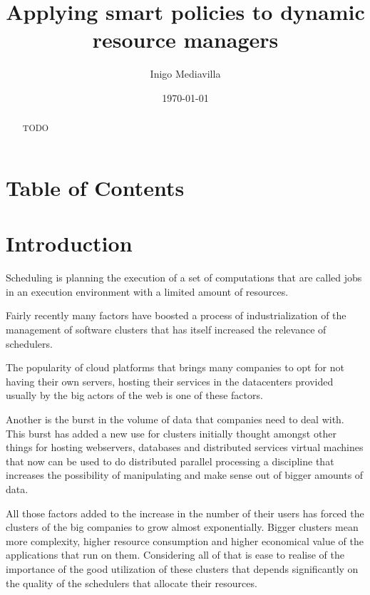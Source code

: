 \documentclass{svjour3}                     %
\begin{document}
\title{ Applying smart policies to dynamic resource managers }


\author{ Inigo Mediavilla }

\date{\today}

\maketitle

\begin{abstract}
TODO
\end{abstract}

\section{Table of Contents}

\tableofcontents

\section{Introduction}

Scheduling is planning the execution of a set of computations that
are called jobs in an execution environment with a limited amount of
resources.

Fairly recently many factors have boosted a process of
industrialization of the management of software clusters that has
itself increased the relevance of schedulers. 

The popularity of cloud platforms that brings
many companies to opt for not having their own servers, hosting their
services in the datacenters provided usually by the big actors of the
web is one of these factors. 

Another is the burst in the volume of data that companies need to deal
with. This burst has added a new use for clusters initially thought
amongst other things for hosting webservers, databases and distributed
services virtual machines that now can be used to do distributed
parallel processing a discipline that increases the possibility of
manipulating and make sense out of bigger amounts of data.

All those factors added to the increase in the number of their users
has forced the clusters of the big companies to grow almost
exponentially. Bigger clusters mean more complexity, higher resource
consumption and higher economical value of the applications that run
on them. Considering all of that is ease to realise of the importance
of the good utilization of these clusters that depends significantly
on the quality of the schedulers that allocate their resources.
\end{document}
